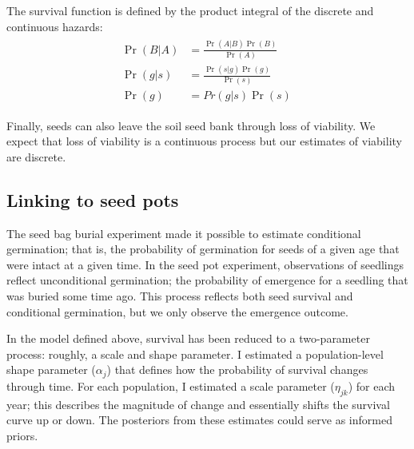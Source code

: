 \documentclass[12pt, oneside, titlepage]{article}   	%
\begin{document}
The survival function is defined by the product integral of the discrete and continuous hazards:
%
\begin{align}
  \begin{split}
\Pr( B|A )  & = \frac{\Pr( A|B ) \Pr( B )}{ \Pr ( A )} \\
\Pr( g | s )  & = \frac{\Pr( s | g ) \Pr( g )}{ \Pr ( s )} \\ 
 \Pr( g ) & = Pr( g | s ) \Pr( s ) \
  \end{split}
\end{align}
%

Finally, seeds can also leave the soil seed bank through loss of viability. We expect that loss of viability is a continuous process but our estimates of viability are discrete.




\subsection{Linking to seed pots}

The seed bag burial experiment made it possible to estimate conditional germination; that is, the probability of germination for seeds of a given age that were intact at a given time. In the seed pot experiment, observations of seedlings reflect unconditional germination; the probability of emergence for a seedling that was buried some time ago. This process reflects both seed survival and conditional germination, but we only observe the emergence outcome.

In the model defined above, survival has been reduced to a two-parameter process: roughly, a scale and shape parameter. I estimated a population-level shape parameter ($\alpha_j$) that defines how the probability of survival changes through time. For each population, I estimated a scale parameter ($\eta_{jk}$) for each year; this describes the magnitude of change and essentially shifts the survival curve up or down. The posteriors from these estimates could serve as informed priors.
\end{document}
